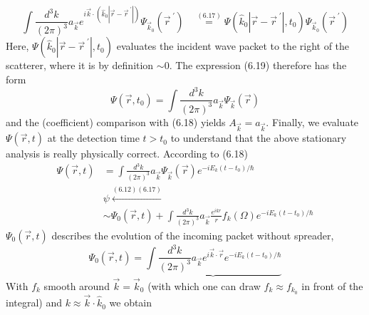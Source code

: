 \begin{equation}
    \int \frac{d^{3} k}{(2 \pi)^{3}} a_{\vec{k}} e^{i \vec{k} \cdot\left(\hat{k}_{0}\left|\vec{r}-\vec{r}^{\;\prime}\right|\right)} \Psi_{\vec{k}_{0}}\left(\vec{r}^{\;\prime}\right) \quad \stackrel{(6.17)}{=} \Psi\left(\hat{k}_{0}\left|\vec{r}-\vec{r}^{\;\prime}\right|, t_{0}\right) \Psi_{\vec{k}_{0}}\left(\vec{r}^{\;\prime}\right)
    \end{equation}
Here, $\Psi(\hat{k}_0|\vec{r}-\vec{r}^{\;\prime}|,t_0)$ evaluates the incident wave packet to the right of the scatterer, where it is by definition $\sim 0$. The expression (6.19) therefore has the form
\begin{equation}
    \Psi\left(\vec{r}, t_{0}\right)=\int \frac{d^{3} k}{(2 \pi)^{3}} a_{\vec{k}} \Psi_{\vec{k}}(\vec{r})
    \end{equation}
and the (coefficient) comparison with (6.18) yields $A_{\vec{k}}=a_{\vec{k}}$. Finally, we evaluate $\Psi (\vec{r}, t)$ at the detection time $t> t_0$ to understand that the above stationary analysis is really physically correct. According to (6.18)
\begin{equation}
\begin{aligned} \Psi(\vec{r}, t) &=\int \frac{d^{3} k}{(2 \pi)^{3}} a_{\vec{k}} \Psi_{\vec{k}}(\vec{r}) e^{-i E_{k}\left(t-t_{0}\right) / \hbar} \\ & \psi \stackrel{(6.12)(6.17)}{\longleftarrow} \\ & \sim \Psi_{0}(\vec{r}, t)+\int \frac{d^{3} k}{(2 \pi)^{3}} a_{\vec{k}} \frac{e^{i k r}}{r} f_{k}(\Omega) e^{-i E_{k}\left(t-t_{0}\right) / \hbar} \end{aligned}
\end{equation}
$\Psi_0(\vec{r},t)$ describes the evolution of the incoming packet without spreader,
\begin{equation}
    \Psi_{0}(\vec{r}, t)=\underbrace{\int \frac{d^{3} k}{(2 \pi)^{3}} a_{\vec{k}} e^{i \vec{k} \cdot \vec{r}} e^{-i E_{k}\left(t-t_{0}\right) / \hbar}}
    \end{equation}
With $f_k$ smooth around $\vec{k}=\vec{k}_0$ (with which one can draw $f_k \approx f_{k_0}$ in front of the integral) and $k\approx\vec{k}\cdot\hat{k}_0$ we obtain

